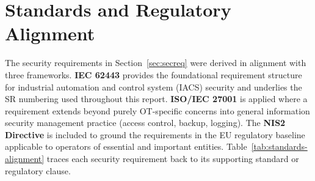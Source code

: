 \section{Standards and Regulatory Alignment}

The security requirements in Section~\ref{sec:secreq} were derived in alignment with three frameworks. \textbf{IEC 62443} provides the foundational requirement structure for industrial automation and control system (IACS) security and underlies the SR numbering used throughout this report. \textbf{ISO/IEC 27001} is applied where a requirement extends beyond purely OT-specific concerns into general information security management practice (access control, backup, logging). The \textbf{NIS2 Directive} is included to ground the requirements in the EU regulatory baseline applicable to operators of essential and important entities. Table~\ref{tab:standards-alignment} traces each security requirement back to its supporting standard or regulatory clause.

\scriptsize
\setlength{\tabcolsep}{4pt}
\renewcommand{\arraystretch}{1.15}

